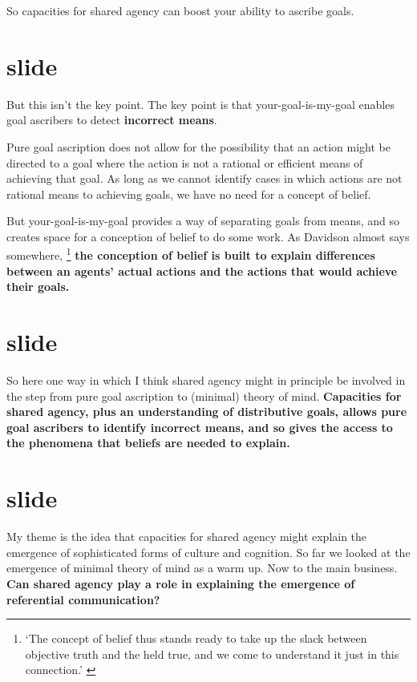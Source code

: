 \documentclass[12pt,\papersize]{extarticle}
\begin{document}
So capacities for shared agency can boost your ability to ascribe goals.


\section{slide}
But this isn't the key point.
The key point is that your-goal-is-my-goal enables goal ascribers to detect \textbf{incorrect means}.

Pure goal ascription does not allow for the possibility that an action might be directed to a goal where the action is not a rational or efficient means of achieving that goal.
As long as we cannot identify cases in which actions are not rational means to achieving goals, we have no need for a concept of belief.

But your-goal-is-my-goal provides a way of separating goals from means, and so creates space for a conception of belief to do some work.
As Davidson almost says somewhere,%
\footnote{
`The concept of belief thus stands ready to take up the slack between objective truth and the held true, and we come to understand it just in this connection.' \citep[p.\ 170] {Davidson:1975eq} 
}
%
 \textbf{the conception of belief is built to explain differences between an agents' actual actions and the actions that would achieve their goals.}


\section{slide}
So here one way in which I think shared agency might in principle be involved in the step from pure goal ascription to (minimal) theory of mind.
\textbf{Capacities for shared agency,
plus an understanding of distributive goals,
allows pure goal ascribers to identify incorrect means,
and so gives the access to the phenomena that beliefs are needed to explain.}


\section{slide}
My theme is the idea that capacities for shared agency might explain the emergence of sophisticated forms of culture and cognition.
So far we looked at the  emergence of minimal theory of mind as a warm up.
Now to the main business.
\textbf{Can shared agency play a role in explaining the emergence of referential communication?}
\end{document}
